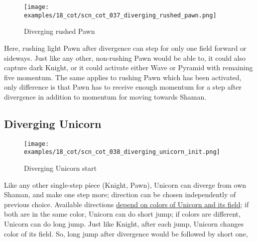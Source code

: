 \noindent
\begin{wrapfigure}[15]{l}{0.4\textwidth}
\centering
\texttt{[image: examples/18\_cot/scn\_cot\_037\_diverging\_rushed\_pawn.png]}
\vspace*{-0.4\baselineskip}
\caption{Diverging rushed Pawn}
\label{fig:scn_cot_037_diverging_rushed_pawn}
\end{wrapfigure}
Here, rushing light Pawn after divergence can step for only one field forward or
sideways. Just like any other, non-rushing Pawn would be able to, it could also
capture dark Knight, or it could activate either Wave or Pyramid with remaining
five momentum.\newline
\indent
The same applies to rushing Pawn which has been activated, only difference is
that Pawn has to receive enough momentum for a step after divergence in addition
to momentum for moving towards Shaman.

\clearpage %

\subsection*{Diverging Unicorn}
\label{sec:Conquest of Tlalocan/Divergence/Diverging Unicorn}

\vspace*{-1.4\baselineskip}
\noindent
\begin{figure}[!h]
\texttt{[image: examples/18\_cot/scn\_cot\_038\_diverging\_unicorn\_init.png]}
\vspace*{-1.3\baselineskip}
\caption{Diverging Unicorn start}
\label{fig:scn_cot_038_diverging_unicorn_init}
\end{figure}

\vspace*{-0.5\baselineskip}
Like any other single-step piece (Knight, Pawn), Unicorn can diverge from own Shaman,
and make one step more; direction can be chosen independently of previous choice.
Available directions
\hyperref[fig:scn_aoa_01_unicorn_same_color]{depend on colors of Unicorn and its field};
if both are in the same color, Unicorn can do short jump; if colors are different, Unicorn
can do long jump. Just like Knight, after each jump, Unicorn changes color of its field.
So, long jump after divergence would be followed by short one,

